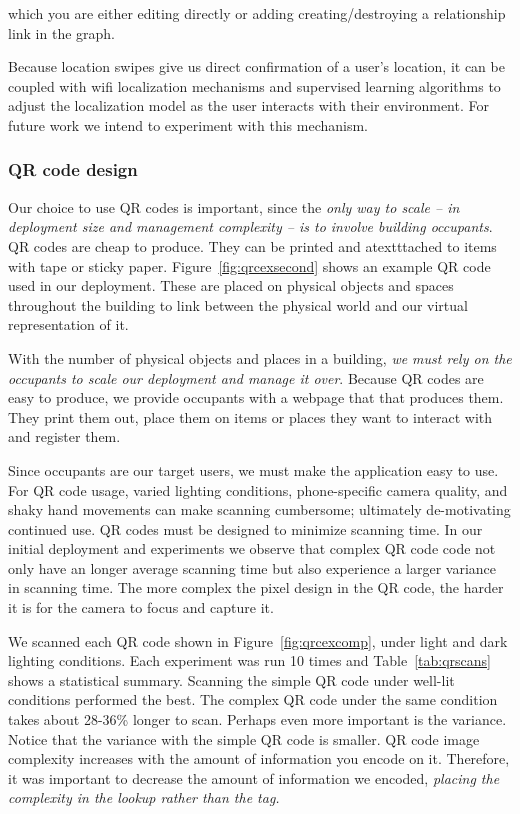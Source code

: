  which you are either editing directly or
adding creating/destroying a relationship link in the graph.

Because location swipes give us direct confirmation of a user's location, it can be coupled with wifi localization mechanisms
and supervised learning algorithms to adjust the localization model as the user interacts with their environment. 
For future work we intend to experiment with this mechanism.%


\subsubsection{QR code design}
\label{sec:qrc}
Our choice to use QR codes is important, since the \emph{only way to scale -- in deployment size and management complexity -- is to
involve building occupants}. QR codes are cheap to produce.  They can be printed and atextttached to items with tape or sticky paper.  
Figure~\ref{fig:qrcexsecond} shows an example QR code used in our deployment.  These are placed on physical
objects and spaces throughout the building to link between the physical world and our virtual representation of it.

With the number of physical objects and places in a building, \emph{we must rely on the occupants
to scale our deployment and manage it over}. Because QR codes are easy to produce, we provide occupants with a webpage that
that produces them.  They print them out, place them on items or places they want to interact with and register them.

Since occupants are our target users, we must make the application easy to use.  For QR code usage, varied lighting conditions, 
phone-specific camera quality, and shaky hand movements can make scanning cumbersome; ultimately de-motivating continued use.  
QR codes must be designed to minimize scanning time.  In our initial deployment and experiments we observe
that complex QR code code not only have an longer average scanning time but also experience a larger variance in scanning time.  
The more complex the pixel design in the QR code, the harder it is for the camera to focus and capture it. 


We scanned each QR code shown in Figure~\ref{fig:qrcexcomp}, under light and dark lighting conditions.  
Each experiment was run 10 times and Table~\ref{tab:qrscans} shows a statistical summary.  Scanning the simple QR code under well-lit 
conditions performed the best.  The complex QR code under  the same condition takes about 28-36\% longer to scan.
Perhaps even more important is the variance.  Notice that the variance with the simple QR code is smaller.
QR code image complexity increases with the amount of information you encode on it.  Therefore, it was important to decrease the
amount of information we encoded, \emph{placing the complexity in the lookup rather than the tag.}

